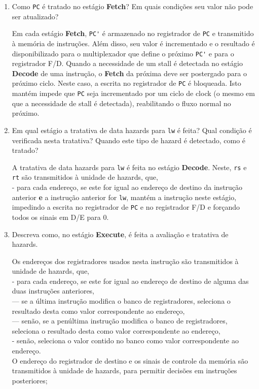 \documentclass{article}
\begin{document}
\begin{enumerate}
\begin{enumerate}
\end{enumerate}

\item Como \verb|PC| é tratado no estágio \textbf{Fetch}? Em quais condições seu valor não pode ser atualizado?

\noindent Em cada estágio \textbf{Fetch}, \verb|PC'| é armazenado no registrador de \verb|PC| e transmitido à memória de instruções. Além disso, seu valor é incrementado e o resultado é disponibilizado para o multiplexador que define o próximo \verb|PC'| e para o registrador F/D. Quando a necessidade de um stall é detectada no estágio \textbf{Decode} de uma instrução, o \textbf{Fetch} da próxima deve ser postergado para o próximo ciclo. Neste caso, a escrita no registrador de \verb|PC| é bloqueada. Isto mantém impede que \verb|PC| seja incrementado por um ciclo de clock (o mesmo em que a necessidade de stall é detectada), reabilitando o fluxo normal no próximo.
\bigbreak

\item Em qual estágio a tratativa de data hazards para \verb|lw| é feita? Qual condição é verificada nesta tratativa? Quando este tipo de hazard é detectado, como é tratado?

\noindent A tratativa de data hazards para \verb|lw| é feita no estágio \textbf{Decode}. Neste, \verb|rs| e \verb|rt| são transmitidos à unidade de hazards, que,\\
- para cada endereço, se este for igual ao endereço de destino da instrução anterior \textbf{e} a instrução anterior for \verb|lw|, mantém a instrução neste estágio, impedindo a escrita no registrador de \verb|PC| e no registrador F/D e forçando todos os sinais em D/E para 0.
\bigbreak

\item Descreva como, no estágio \textbf{Execute}, é feita a avaliação e tratativa de hazards.

\noindent Os endereços dos registradores usados nesta instrução são transmitidos à unidade de hazards, que,\\
- para cada endereço, se este for igual ao endereço de destino de alguma das duas instruções anteriores,\\
--- se a última instrução modifica o banco de registradores, seleciona o resultado desta como valor correspondente ao endereço,\\
--- senão, se a penúltima instrução modifica o banco de registradores, seleciona o resultado desta como valor correspondente ao endereço,\\
- senão, seleciona o valor contido no banco como valor correspondente ao endereço.\\
O endereço do registrador de destino e os sinais de controle da memória são transmitidos à unidade de hazards, para permitir decisões em instruções posteriores;
\bigbreak


\end{enumerate}
\end{document}
